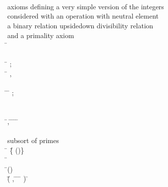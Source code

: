 \begin{hetcasl}
\\
\\
\\
{\small{}\KW{\%\%}\Ax{\%}axioms defining a very simple version of the integers\Ax{,}}\\
{\small{}\KW{\%\%}\Ax{\%}considered with an operation \Ax{*} with neutral element\Ax{,}}\\
{\small{}\KW{\%\%}\Ax{\%} a binary relation \Ax{|}\Ax{|} \Ax{(}upside\Ax{-}down divisibility relation\Ax{)}}\\
{\small{}\KW{\%\%}\Ax{\%} and a primality axiom}\\
\SPEC \= \Ax{=}\\
\> \SORT {}\\
\> \OPS \= \Ax{:} ;\\
\>\> \Ax{\_\_}\Ax{\_\_} \Ax{:} \= \Ax{\times}  \Ax{\rightarrow} , \\
\>\>  \\
\> \PREDS \=\Ax{\_\_}\Ax{||}\Ax{\_\_} \Ax{:} \= \Ax{\times} ;\\
\>\>  \Ax{:} \\
\>\> {\small{}\KW{\%}\Ax{\%}}\\
\> \Ax{\forall} \=,  \Ax{:}  \Ax{\bullet} \= \Ax{||}  \Ax{\Leftrightarrow} \=\Ax{\exists}  \Ax{:}  \Ax{\bullet} \= \Ax{=} \=  \\
\> \\
\> {\small{}\KW{\%\%} subsort of primes}\\
\> \SORT \= \Ax{=} \=\{ \Ax{:}  \Ax{\bullet} ()\}\\
\> \Ax{\forall} \= \Ax{:}  \\
\> \Ax{\bullet} \=() \\
\>\> \Ax{\Leftrightarrow} \=(\=\Ax{\forall} ,  \Ax{:}  \Ax{\bullet} \=   \Ax{||}  \Ax{\Rightarrow} \= \Ax{||}  \Ax{\vee} \= \Ax{||} ) \Ax{\wedge} \Ax{\neg} \= \Ax{=} \\
\> {\small{}\KW{\%}\Ax{\%}}\\
\\
\\

\end{hetcasl}
